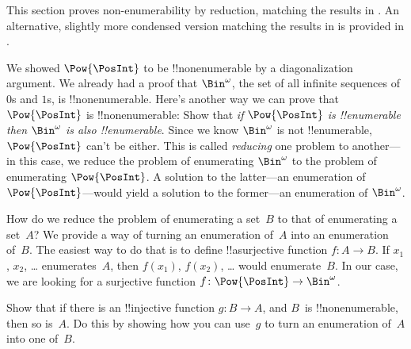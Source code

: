 \documentclass[../../../include/open-logic-section]{subfiles}
\begin{document}

\begin{editorial}
  This section proves non-enumerability by reduction, matching the
  results in . An alternative, slightly more condensed
  version matching the results in  is provided in
  .
\end{editorial}

We showed $\Pow{\PosInt}$ to be !!{nonenumerable} by a diagonalization
argument. We already had a proof that $\Bin^\omega$, the set of all
infinite sequences of $0$s and $1$s, is !!{nonenumerable}.  Here's
another way we can prove that $\Pow{\PosInt}$ is !!{nonenumerable}:
Show that \emph{if $\Pow{\PosInt}$ is !!{enumerable} then $\Bin^\omega$
  is also !!{enumerable}}.  Since we know $\Bin^\omega$ is not
!!{enumerable}, $\Pow{\PosInt}$ can't be either.  This is called
\emph{reducing} one problem to another---in this case, we reduce the
problem of enumerating $\Bin^\omega$ to the problem of enumerating
$\Pow{\PosInt}$.  A solution to the latter---an enumeration of
$\Pow{\PosInt}$---would yield a solution to the former---an enumeration
of $\Bin^\omega$.

How do we reduce the problem of enumerating a set~$B$ to that of
enumerating a set~$A$?  We provide a way of turning an enumeration
of~$A$ into an enumeration of~$B$.  The easiest way to do that is to
define !!a{surjective} function $f\colon A \to B$.  If $x_1$, $x_2$,
\dots{} enumerates~$A$, then $f(x_1)$, $f(x_2)$, \dots{} would
enumerate~$B$.  In our case, we are looking for a surjective
function $f\colon \Pow{\PosInt} \to \Bin^\omega$.

\begin{prob}
Show that if there is an !!{injective} function $g\colon B \to A$, and
$B$~is !!{nonenumerable}, then so is~$A$. Do this by showing how you
can use~$g$ to turn an enumeration of~$A$ into one of~$B$.
\end{prob}
\end{document}
